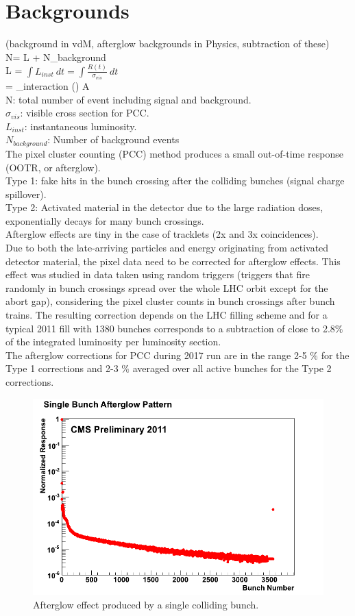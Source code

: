 \section{Backgrounds}
\label{sec:bkg}
(background in vdM, afterglow backgrounds in Physics, subtraction of these) \\

N= \sigma \:L + N_{background} \\
L = $ \int L_{inst} \: dt = \int \frac{R(t)}{\sigma_{vis}} \:dt $  \\ \sigma = \sigma_{interaction} () \: A \:\epsilon\\

N: total number of event including signal and background. \\
$\sigma_{vis}$: visible cross section for PCC.\\
$L_{inst}$: instantaneous luminosity.\\
$N_{background}$: Number of background events \\

The pixel cluster counting (PCC) method produces a small out-of-time response (OOTR, or afterglow).\\
Type 1: fake hits in the bunch crossing after the colliding bunches (signal charge spillover).\\
Type 2: Activated material in the detector due to the large radiation doses, exponentially decays for many bunch crossings.\\
Afterglow effects are tiny in the case of tracklets (2x and 3x coincidences).\\

Due to both the late-arriving particles and energy originating from activated detector material, the pixel data need to be corrected for afterglow effects. This effect was studied in data taken using random triggers (triggers that fire randomly in bunch crossings spread over the whole LHC orbit except for the abort gap), considering the pixel cluster counts in bunch crossings after bunch trains. The resulting correction depends on the LHC filling scheme and for a typical 2011 fill with 1380 bunches corresponds to a subtraction of close to 2.8$\%$ of the integrated luminosity per luminosity section. \\

The afterglow corrections for PCC during 2017 run are in the range 2-5 $\%$ for the Type 1 corrections and 2-3 $\%$ averaged over all active bunches for the Type 2 corrections.

\begin{figure}[H]
  \centering
  \includegraphics[width=0.5\columnwidth]{./SingleBunchAfterglow.png}
  \caption{Afterglow effect produced by a single colliding bunch.}
  \label{fig:LHC}
\end{figure}


